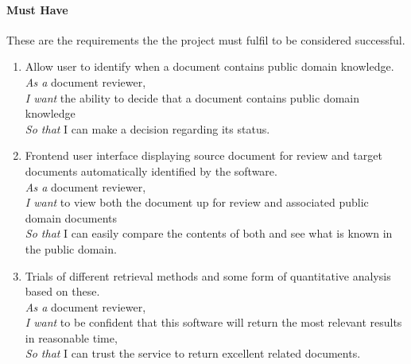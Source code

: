 \documentclass{l4proj}
\begin{document}
\paragraph{Must Have}
These are the requirements the the project must fulfil to be considered successful.
\begin{enumerate}[label=\textbf{M.\arabic*}]
\item Allow user to identify when a document contains public domain knowledge. \\
\textit{As a} document reviewer, \\
\textit{I want} the ability to decide that a document contains public domain knowledge \\
\textit{So that} I can make a decision regarding its status. \\
\item Frontend user interface displaying source document for review and target documents automatically identified by the software. \\
\textit{As a} document reviewer, \\
\textit{I want} to view both the document up for review and associated public domain documents \\
\textit{So that} I can easily compare the contents of both and see what is known in the public domain.
\item Trials of different retrieval methods and some form of quantitative analysis based on these. \\
\textit{As a} document reviewer, \\
\textit{I want} to be confident that this software will return the most relevant results in reasonable time, \\
\textit{So that} I can trust the service to return excellent related documents.
\end{enumerate}
\end{document}
